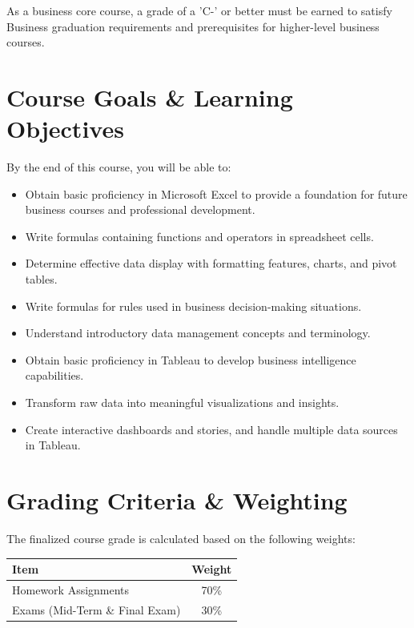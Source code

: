 \documentclass[11pt,a4paper]{article}
\begin{document}
As a business core course, a grade of a 'C-' or better must be earned to satisfy Business graduation requirements and prerequisites for higher-level business courses. 

\section*{Course Goals \& Learning Objectives}
By the end of this course, you will be able to:
\begin{itemize}
    \item Obtain basic proficiency in Microsoft Excel to provide a foundation for future business courses and professional development.
    \item Write formulas containing functions and operators in spreadsheet cells.
    \item Determine effective data display with formatting features, charts, and pivot tables.
    \item Write formulas for rules used in business decision-making situations.
    \item Understand introductory data management concepts and terminology.
    \item Obtain basic proficiency in Tableau to develop business intelligence capabilities.
    \item Transform raw data into meaningful visualizations and insights.
    \item Create interactive dashboards and stories, and handle multiple data sources in Tableau.
\end{itemize}

\section*{Grading Criteria \& Weighting}
The finalized course grade is calculated based on the following weights:
\begin{center}
    \begin{tabular}{lc}
        \toprule
        \textbf{Item} & \textbf{Weight} \\
        \midrule
        Homework Assignments & 70\% \\
        Exams (Mid-Term \& Final Exam) & 30\% \\
        \bottomrule
    \end{tabular}
\end{center}
\end{document}
